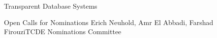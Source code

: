 \documentclass[11pt]{article}
\begin{document}
\begin{bulletin}
\begin{articlesection}{Transparent Database Systems}
\end{articlesection}


\begin{newssection}{}%


\begin{news}{Open Calls for Nominations}
{Erich Neuhold, Amr El Abbadi, Farshad Firouzi}{TCDE Nominations Committee}

\end{news}
\newpage
\end{newssection}

\begin{callsection}


\end{callsection}
\end{bulletin}
\end{document}
